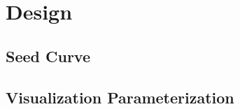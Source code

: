\section{Design}
\label{s:streamsurfaces:design}


\subsection{Seed Curve}

\subsection{Visualization Parameterization}